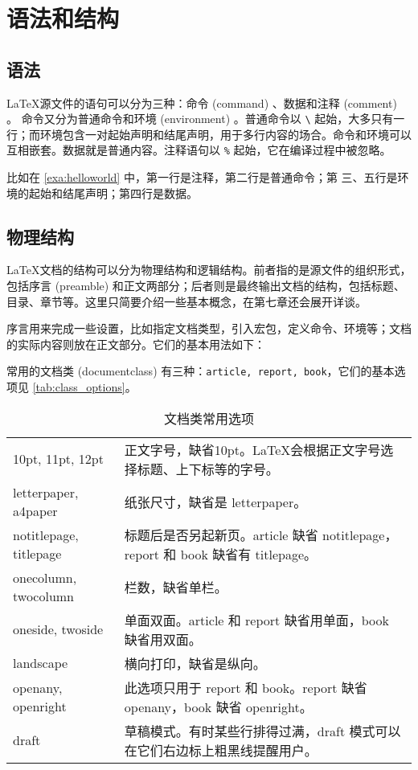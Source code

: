 \section{语法和结构}\label{sec:structure}

\subsection{语法}

\LaTeX 源文件的语句可以分为三种：命令 (command) 、数据和注释 (comment) 。
命令又分为普通命令和环境 (environment) 。普通命令以 \verb|\| 起始，大多只有一行；而环境包含一对起始声明和结尾声明，用于多行内容的场合。命令和环境可以互相嵌套。数据就是普通内容。注释语句以 \verb|%| 起始，它在编译过程中被忽略。

比如在 \autoref{exa:helloworld} 中，第一行是注释，第二行是普通命令；第
三、五行是环境的起始和结尾声明；第四行是数据。

\subsection{物理结构}

\LaTeX 文档的结构可以分为物理结构和逻辑结构。前者指的是源文件的组织形式，包括序言 (preamble) 和正文两部分；后者则是最终输出文档的结构，包括标题、目录、章节等。这里只简要介绍一些基本概念，在第七章还会展开详谈。

序言用来完成一些设置，比如指定文档类型，引入宏包，定义命令、环境等；文档的实际内容则放在正文部分。它们的基本用法如下：


常用的文档类 (documentclass) 有三种：\texttt{article, report, book}，它们的基本选项见 \autoref{tab:class_options}。

\begin{table}[htbp]
\centering
\caption{文档类常用选项}
\label{tab:class_options}
\begin{tabularx}{350pt}{lX}
  \toprule
  10pt, 11pt, 12pt & 正文字号，缺省10pt。\LaTeX 会根据正文字号选择标题、上下标等的字号。\\
  letterpaper, a4paper & 纸张尺寸，缺省是 letterpaper。\\
  notitlepage, titlepage & 标题后是否另起新页。article 缺省 notitlepage，report 和 book 缺省有 titlepage。\\
  onecolumn, twocolumn & 栏数，缺省单栏。\\
  oneside, twoside & 单面双面。article 和 report 缺省用单面，book 缺省用双面。\\
  landscape & 横向打印，缺省是纵向。\\
  openany, openright & 此选项只用于 report 和 book。report 缺省 openany，book 缺省 openright。\\
  draft & 草稿模式。有时某些行排得过满，draft 模式可以在它们右边标上粗黑线提醒用户。\\
  \bottomrule
\end{tabularx}
\end{table}


